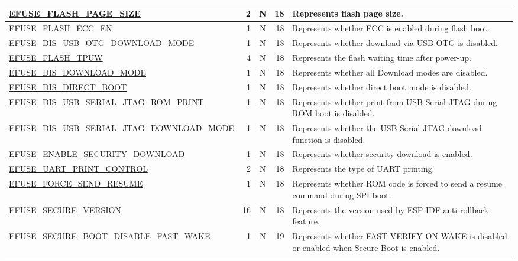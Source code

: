 \begin{longtable}[l]{ |m{8.2cm}|r|c|r|m{9cm}| }
    \hline
    \hyperref[fielddesc:EFUSEFLASHPAGESIZE]{EFUSE\_FLASH\_PAGE\_SIZE} & 2 & N & 18 & Represents flash page size. \\
    \hline
    \hyperref[fielddesc:EFUSEFLASHECCEN]{EFUSE\_FLASH\_ECC\_EN} & 1 & N & 18 & Represents whether ECC is enabled during flash boot. \\
    \hline
    \hyperref[fielddesc:EFUSEDISUSBOTGDOWNLOADMODE]{EFUSE\_DIS\_USB\_OTG\_DOWNLOAD\_MODE} & 1 & N & 18 & Represents whether download via USB-OTG is disabled. \\
    \hline
    \hyperref[fielddesc:EFUSEFLASHTPUW]{EFUSE\_FLASH\_TPUW} & 4 & N & 18 & Represents the flash waiting time after power-up.\\
    \hline
    \hyperref[fielddesc:EFUSEDISDOWNLOADMODE]{EFUSE\_DIS\_DOWNLOAD\_MODE} & 1 & N & 18 & Represents whether all Download modes are disabled.\\
    \hline
    \hyperref[fielddesc:EFUSEDISDIRECTBOOT]{EFUSE\_DIS\_DIRECT\_BOOT} & 1 & N & 18 & Represents whether direct boot mode is disabled.\\
    \hline
    \hyperref[fielddesc:EFUSEDISUSBSERIALJTAGROMPRINT]{EFUSE\_DIS\_USB\_SERIAL\_JTAG\_ROM\_PRINT} & 1 & N & 18 & Represents whether print from USB-Serial-JTAG during ROM boot is disabled.\\
    \hline
    \hyperref[fielddesc:EFUSEDISUSBSERIALJTAGDOWNLOADMODE]{EFUSE\_DIS\_USB\_SERIAL\_JTAG\_DOWNLOAD\_MODE} & 1 & N & 18 & Represents whether the USB-Serial-JTAG download function is disabled. \\
    \hline
    \hyperref[fielddesc:EFUSEENABLESECURITYDOWNLOAD]{EFUSE\_ENABLE\_SECURITY\_DOWNLOAD} & 1 & N & 18 & Represents whether security download is enabled. \\
    \hline
    \hyperref[fielddesc:EFUSEUARTPRINTCONTROL]{EFUSE\_UART\_PRINT\_CONTROL} & 2 & N & 18 & Represents the type of UART printing.\\
    \hline
    \hyperref[fielddesc:EFUSEFORCESENDRESUME]{EFUSE\_FORCE\_SEND\_RESUME} & 1 & N & 18 & Represents whether ROM code is forced to send a resume command during SPI boot. \\
    \hline
    \hyperref[fielddesc:EFUSESECUREVERSION]{EFUSE\_SECURE\_VERSION} & 16 & N & 18 & Represents the version used by ESP-IDF anti-rollback feature. \\
    \hline
    \hyperref[fielddesc:EFUSESECUREBOOTDISABLEFASTWAKE]{EFUSE\_SECURE\_BOOT\_DISABLE\_FAST\_WAKE} & 1 & N & 19 & Represents whether FAST VERIFY ON WAKE is disabled or enabled when Secure Boot is enabled.\\

\end{longtable}
